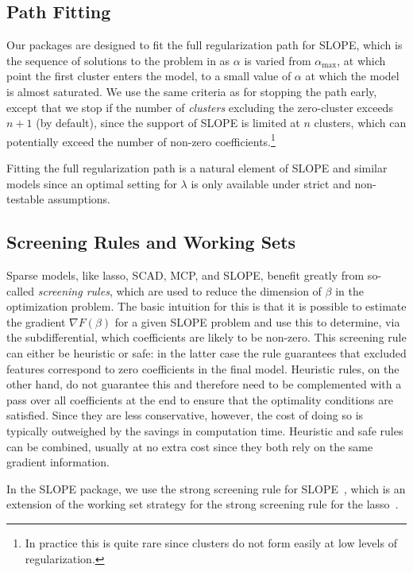 \documentclass[article]{jss}
\let\Cref\crtCref
\begin{document}
\subsection{Path Fitting}

Our packages are designed to fit the full regularization path for SLOPE, which
is the sequence of solutions to the problem in \Cref{eq:slope} as \(\alpha\) is varied
from \(\alpha_\text{max}\), at which point the first cluster enters the model,
to a small value of \(\alpha\) at which the model is almost saturated.
We use the same criteria as \citet{friedman2010} for stopping the path early,
except that we stop if the number of \emph{clusters} excluding the zero-cluster
exceeds \(n + 1\) (by default), since the support of SLOPE is limited at \(n\) clusters,
which can potentially exceed the number of non-zero coefficients.\footnote{In practice
  this is quite rare since clusters do not form easily at low levels of regularization.}

Fitting the full regularization path is a natural element of SLOPE and similar
models since an optimal setting for \(\lambda\) is only available under
strict and non-testable assumptions.

\subsection{Screening Rules and Working Sets}

Sparse models, like lasso, SCAD, MCP, and SLOPE, benefit greatly from
so-called \emph{screening rules}, which are used to reduce the dimension of
\(\beta\) in the optimization problem. The basic intuition for this is that
it is possible to estimate the gradient \(\nabla F(\beta) \) for a given SLOPE problem
and use this to determine, via the subdifferential, which coefficients are
likely to be non-zero. This screening rule can either be heuristic or safe:
in the latter case the rule guarantees that excluded features correspond
to zero coefficients in the final model. Heuristic rules, on the other hand,
do not guarantee this and therefore need to be complemented with a pass
over all coefficients at the end to ensure that the optimality conditions
are satisfied. Since they are less conservative, however, the cost of
doing so is typically outweighed by the savings in computation time.
Heuristic and safe rules can be combined, usually at no extra cost since
they both rely on the same gradient information.

In the SLOPE package, we use the strong screening rule for
SLOPE~\citep{larsson2020a}, which is an extension of the working set strategy
for the strong screening rule for the lasso~\citep{tibshirani2012}.
\end{document}
